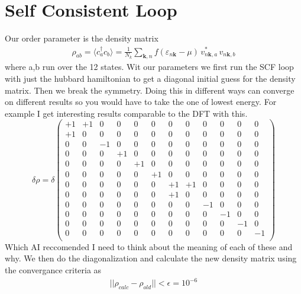 \documentclass[11pt]{article}
\begin{document}
\section{Self Consistent Loop}
Our order parameter is the density matrix
\begin{gather}
    \rho_{ab} = \langle c^\dagger_a c_b \rangle = \frac{1}{N_k} 
    \sum_{\mathbf{k},n} f(\varepsilon_{n\mathbf{k}} - \mu)\, v_{n\mathbf{k},a}^* \, v_{n\mathbf{k},b}
\end{gather}
where a,b run over the 12 states. Wit our parameters we first run the SCF loop with 
just the hubbard hamiltonian to get a diagonal initial guess for the density matrix.
Then we break the symmetry. Doing this in different ways can converge on different
results so you would have to take the one of lowest energy. For example I get interesting
results comparable to the DFT with this.
\begin{equation*}
\delta\rho = \delta
\begin{pmatrix}
    +1 & +1 &  0 &  0 &  0 &  0 &  0 &  0 &  0 &  0 &  0 &  0 \\
    +1 &  0 &  0 &  0 &  0 &  0 &  0 &  0 &  0 &  0 &  0 &  0 \\
    0 &  0 & -1 &  0 &  0 &  0 &  0 &  0 &  0 &  0 &  0 &  0 \\
    0 &  0 &  0 & +1 &  0 &  0 &  0 &  0 &  0 &  0 &  0 &  0 \\
    0 &  0 &  0 &  0 & +1 &  0 &  0 &  0 &  0 &  0 &  0 &  0 \\
    0 &  0 &  0 &  0 &  0 & +1 &  0 &  0 &  0 &  0 &  0 &  0 \\
    0 &  0 &  0 &  0 &  0 &  0 & +1 & +1 &  0 &  0 &  0 &  0 \\
    0 &  0 &  0 &  0 &  0 &  0 & +1 &  0 &  0 &  0 &  0 &  0 \\
    0 &  0 &  0 &  0 &  0 &  0 &  0 &  0 & -1 &  0 &  0 &  0 \\
    0 &  0 &  0 &  0 &  0 &  0 &  0 &  0 &  0 & -1 &  0 &  0 \\
    0 &  0 &  0 &  0 &  0 &  0 &  0 &  0 &  0 &  0 & -1 &  0 \\
    0 &  0 &  0 &  0 &  0 &  0 &  0 &  0 &  0 &  0 &  0 & -1 \\
\end{pmatrix}
\end{equation*}
Which AI reccomended I need to think about the meaning of each of these and why. We then
do the diagonalization and calculate the new density matrix using the convergance criteria as
\begin{gather}
    || \rho_{calc} - \rho_{old} || < \epsilon = 10^{-6}
\end{gather}
\end{document}
